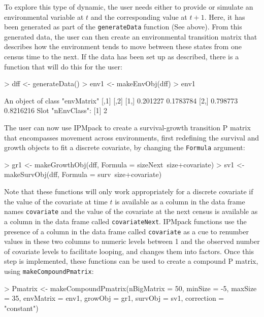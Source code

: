 \documentclass{article}
\begin{document}
To explore this type of dynamic, the user needs  either to provide or simulate
an environmental variable at $t$ and the corresponding value at $t+1$. Here, it
has been generated as part of the {\tt generateData} function (See above). From
this generated data, the user can then create an environmental transition matrix
that describes how the environment tends to move between these states from one
census time to the next. If the data has been set up as described, there is a function that will do this for the user:
\begin{Schunk}
\begin{Sinput}
> dff <- generateData()
> env1 <- makeEnvObj(dff) 
> env1
\end{Sinput}
\begin{Soutput}
An object of class "envMatrix"
         [,1]      [,2]
[1,] 0.201227 0.1783784
[2,] 0.798773 0.8216216
Slot "nEnvClass":
[1] 2
\end{Soutput}
\end{Schunk}
The user can now use IPMpack to create a survival-growth transition P matrix that encompasses movement across environments, first redefining the survival and growth
objects to fit a discrete covariate, by changing the {\tt Formula} argument: 
\begin{Schunk}
\begin{Sinput}
> gr1 <- makeGrowthObj(dff, Formula = sizeNext~size+covariate)
> sv1 <- makeSurvObj(dff, Formula = surv~size+covariate)
\end{Sinput}
\end{Schunk}
Note that these functions will only work appropriately for a discrete
covariate if the value of the covariate at time $t$ is available as a
column in the data frame names {\tt covariate} and the value of the
covariate at the next census is available as a column in the data
frame called {\tt covariateNext}. IPMpack functions use the presence
of a column in the data frame called {\tt covariate} as a cue to
renumber values in these two columns to numeric levels between 1 and
the observed number of covariate levels to facilitate looping, and
changes them into factors. Once this step is implemented, these
functions can be used to create a compound P matrix, using {\tt makeCompoundPmatrix}: 
\begin{Schunk}
\begin{Sinput}
> Pmatrix <- makeCompoundPmatrix(nBigMatrix = 50, minSize = -5, 
                                   maxSize = 35, 
                                   envMatrix = env1, growObj = gr1, 
                                   survObj = sv1, 
                                   correction = "constant")
\end{Sinput}
\end{Schunk}
\end{document}
